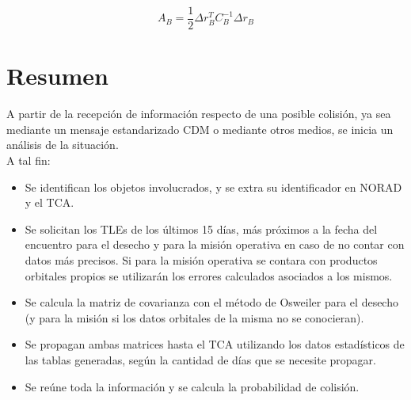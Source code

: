 \begin{equation}
A_{B}=\frac{1}{2}\Delta r^{T}_{B} C^{-1}_{B} \Delta r_{B}
\end{equation}

\section*{Resumen}
A partir de la recepci\'on de informaci\'on respecto de una posible colisi\'on, ya sea mediante un mensaje estandarizado CDM o mediante otros medios, se inicia un an\'alisis de la situaci\'on.\\
A tal fin:\\
\begin{itemize}
 \item Se identifican los objetos involucrados, y se extra su identificador en NORAD y el TCA.
 \item Se solicitan los TLEs de los \'ultimos 15 d\'ias, m\'as pr\'oximos a la fecha del encuentro para el desecho y para la misi\'on operativa en caso de no contar con datos m\'as precisos. Si para la misi\'on operativa se contara con productos orbitales propios se utilizar\'an los errores calculados asociados a los mismos.
 \item Se calcula la matriz de covarianza con el m\'etodo de Osweiler para el desecho (y para la misi\'on si los datos orbitales de la misma no se conocieran).
 \item Se propagan ambas matrices hasta el TCA utilizando los datos estad\'isticos de las tablas generadas, seg\'un la cantidad de d\'ias que se necesite propagar.
 \item Se re\'une toda la informaci\'on y se calcula la probabilidad de colisi\'on.
\end{itemize}

